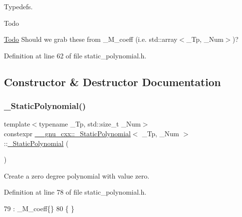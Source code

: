 Typedefs. \begin{DoxyRefDesc}{Todo}
\item[\hyperlink{todo__todo000001}{Todo}]Should we grab these from \+\_\+\+M\+\_\+coeff (i.\+e. std\+::array$<$\+\_\+\+Tp, \+\_\+\+Num$>$)? \end{DoxyRefDesc}


Definition at line 62 of file static\+\_\+polynomial.\+h.



\subsection{Constructor \& Destructor Documentation}
\mbox{\label{class____gnu__cxx_1_1__StaticPolynomial_abbea33a8746fecebbf176da4e8e6c92d}} 
\subsubsection{\texorpdfstring{\+\_\+\+Static\+Polynomial()}{\_StaticPolynomial()}\hspace{0.1cm}{\footnotesize\ttfamily [1/7]}}
{\footnotesize\ttfamily template$<$typename \+\_\+\+Tp, std\+::size\+\_\+t \+\_\+\+Num$>$ \\
constexpr \hyperlink{class____gnu__cxx_1_1__StaticPolynomial}{\+\_\+\+\_\+gnu\+\_\+cxx\+::\+\_\+\+Static\+Polynomial}$<$ \+\_\+\+Tp, \+\_\+\+Num $>$\+::\hyperlink{class____gnu__cxx_1_1__StaticPolynomial}{\+\_\+\+Static\+Polynomial} (\begin{DoxyParamCaption}{ }\end{DoxyParamCaption})\hspace{0.3cm}{\ttfamily [inline]}}

Create a zero degree polynomial with value zero. 

Definition at line 78 of file static\+\_\+polynomial.\+h.


\begin{DoxyCode}
79       : \_M\_coeff\{\}
80       \{ \}
\end{DoxyCode}
\mbox{\label{class____gnu__cxx_1_1__StaticPolynomial_ac78f6e97c292f3b391eac620afdbbab5}} 
